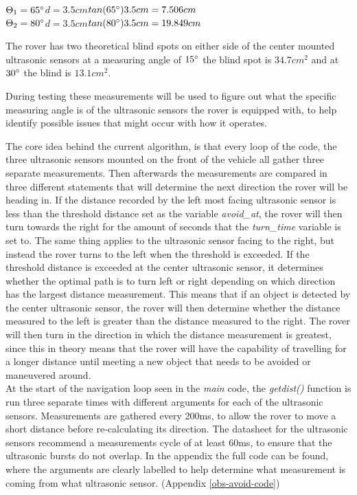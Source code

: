 $\Theta_1 = 65\degree$\quad\quad$d = 3.5cm$\quad\quad$tan(65\degree)3.5cm =  7.506cm$\\
$\Theta_2 = 80\degree$\quad\quad$d = 3.5cm$\quad\quad$tan(80\degree)3.5cm =  19.849cm$

The rover has two theoretical blind spots on either side of the center mounted ultrasonic sensors at a measuring angle of $15\degree$ the blind spot is $34.7cm^2$ and at $30\degree$ the blind is $13.1cm^2$. 

During testing these measurements will be used to figure out what the specific measuring angle is of the ultrasonic sensors the rover is equipped with, to help identify possible issues that might occur with how it operates.

\clearpage


The core idea behind the current algorithm, is that every loop of the code, the three ultrasonic sensors mounted on the front of the vehicle all gather three separate measurements. Then afterwards the measurements are compared in three different statements that will determine the next direction the rover will be heading in. If the distance recorded by the left most facing ultrasonic sensor is less than the threshold distance set as the variable \textit{avoid\_at}, the rover will then turn towards the right for the amount of seconds that the \textit{turn\_time} variable is set to. The same thing applies to the ultrasonic sensor facing to the right, but instead the rover turns to the left when the threshold is exceeded.
If the threshold distance is exceeded at the center ultrasonic sensor, it determines whether the optimal path is to turn left or right depending on which direction has the largest distance measurement. This means that if an object is detected by the center ultrasonic sensor, the rover will then determine whether the distance measured to the left is greater than the distance measured to the right. The rover will then turn in the direction in which the distance measurement is greatest, since this in theory means that the rover will have the capability of travelling for a longer distance until meeting a new object that needs to be avoided or maneuvered around.\\




At the start of the navigation loop seen in the \textit{main} code, the \textit{getdist()} function is run three separate times with different arguments for each of the ultrasonic sensors. Measurements are gathered every 200ms, to allow the rover to move a short distance before re-calculating its direction. The datasheet for the ultrasonic sensors recommend a measurements cycle of at least 60ms, to ensure that the ultrasonic bursts do not overlap. In the appendix the full code can be found, where the arguments are clearly labelled to help determine what measurement is coming from what ultrasonic sensor. (Appendix \ref{obs-avoid-code})